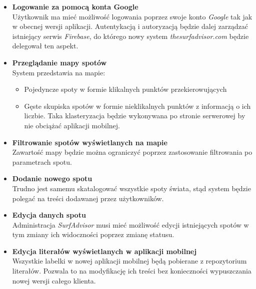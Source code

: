 \begin{itemize}
    \item
    \textbf{Logowanie za pomocą konta Google}\\
    Użytkownik ma mieć możliwość logowania poprzez swoje konto \emph{Google} tak jak w obecnej wersji aplikacji.
    Autentykacją i autoryzacją będzie dalej zarządzać istniejący serwis \emph{Firebase}, do którego nowy system \emph{thesurfadvisor.com} będzie delegował ten aspekt.

    \item
    \textbf{Przeglądanie mapy spotów}\\
    System przedstawia na mapie: 

    \begin{itemize}
    \item
    Pojedyncze spoty w formie klikalnych punktów przekierowujących

    \item
    Gęste skupiska spotów w formie nieklikalnych punktów z informacją o ich liczbie.
    Taka klasteryzacja będzie wykonywana po stronie serwerowej by nie obciążać aplikacji mobilnej.

    \end{itemize}

    \item
    \textbf{Filtrowanie spotów wyświetlanych na mapie}\\
    Zawartość mapy będzie można ograniczyć poprzez zastosowanie filtrowania po parametrach spotu.

    \item
    \textbf{Dodanie nowego spotu}\\
    Trudno jest samemu skatalogować wszystkie spoty świata, stąd system będzie polegać na treści dodawanej przez użytkowników.

    \item
    \textbf{Edycja danych spotu}\\
    Administracja \emph{SurfAdvisor} musi mieć możliwość edycji istniejących spotów w tym zmiany ich widoczności poprzez zmianę statusu.

    \item
    \textbf{Edycja literałów wyświetlanych w aplikacji mobilnej}\\
    Wszystkie labelki w nowej aplikacji mobilnej będą pobierane z repozytorium literałów.
    Pozwala to na modyfikację ich treści bez konieczności wypuszczania nowej wersji całego klienta.
\end{itemize} 


